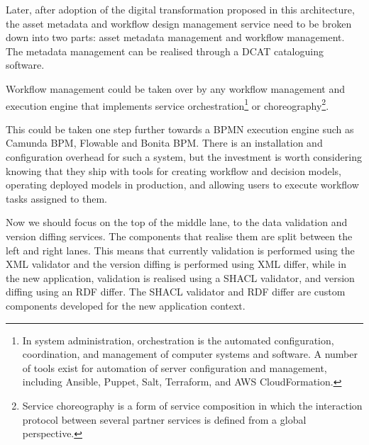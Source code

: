 	
	Later, after adoption of the digital transformation proposed in this architecture, the asset metadata and workflow design management service need to be broken down into two parts: asset metadata management and workflow management. The metadata management can be realised through a DCAT \citep{dcat2} cataloguing software. 
	
	Workflow management could be taken over by any workflow management and execution engine that implements service orchestration\footnote{In system administration, orchestration is the automated configuration, coordination, and management of computer systems and software. A number of tools exist for automation of server configuration and management, including Ansible, Puppet, Salt, Terraform, and AWS CloudFormation.} or choreography\footnote{Service choreography is a form of service composition in which the interaction protocol between several partner services is defined from a global perspective.}. 
	
	This could be taken one step further towards a BPMN \citep{bpmn-introduction} execution engine such as Camunda BPM, Flowable and Bonita BPM. There is an installation and configuration overhead for such a system, but the investment is worth considering knowing that they ship with tools for creating workflow and decision models, operating deployed models in production, and allowing users to execute workflow tasks assigned to them. 
	
	Now we should focus on the top of the middle lane, to the data validation and version diffing services. The components that realise them are split between the left and right lanes. This means that currently validation is performed using the XML validator and the version diffing is performed using XML differ, while in the new application, validation is realised using a SHACL \citep{shacl-spec} validator, and version diffing using an RDF differ. The SHACL validator and RDF differ are custom components developed for the new application context.
	

